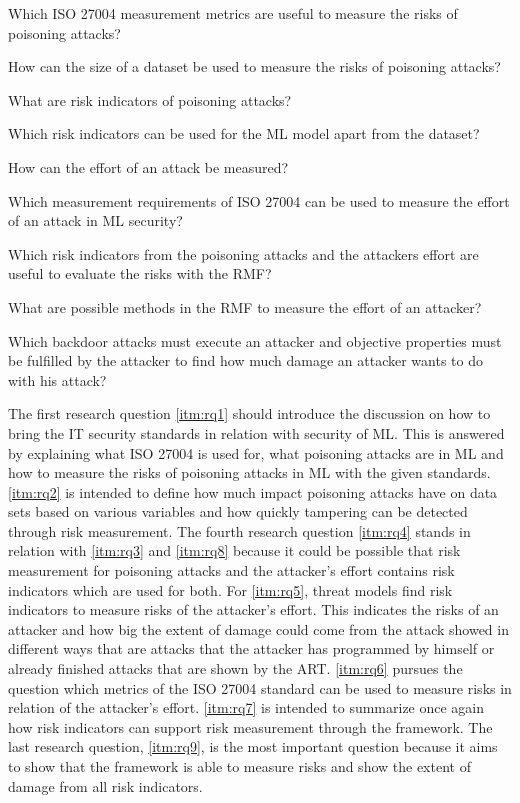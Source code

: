 \begin{questions}
  \item Which ISO 27004 measurement metrics are useful to measure the risks of poisoning attacks? \label{itm:rq1}
  \item How can the size of a dataset be used to measure the risks of poisoning attacks? \label{itm:rq2}
  \item What are risk indicators of poisoning attacks? \label{itm:rq3}
  \item Which risk indicators can be used for the ML model apart from the dataset? \label{itm:rq4}
  \item How can the effort of an attack be measured? \label{itm:rq5}
  \item Which measurement requirements of ISO 27004 can be used to measure the effort of an attack in ML security? \label{itm:rq6}
  \item Which risk indicators from the poisoning attacks and the attackers effort are useful to evaluate the risks with the RMF? \label{itm:rq7}
  \item What are possible methods in the RMF to measure the effort of an attacker? \label{itm:rq8}
  \item Which backdoor attacks must execute an attacker and objective properties must be fulfilled by the attacker to find how much damage an attacker wants to do with his attack?
  \label{itm:rq9}
\end{questions}

The first research question \ref{itm:rq1} should introduce the discussion on how to bring the IT security standards in relation with security of ML. This is answered by explaining what ISO
27004 is used for, what poisoning attacks are in ML and how to measure the risks of poisoning attacks in ML with the given standards. \ref{itm:rq2} is intended to define how much
impact poisoning attacks have on data sets based on various variables and how quickly tampering can be detected through risk measurement. The fourth research question \ref{itm:rq4} stands in relation with \ref{itm:rq3} and \ref{itm:rq8} because it could be possible that risk measurement for poisoning attacks and the attacker's effort contains risk indicators which are used for both. For \ref{itm:rq5}, threat models find risk indicators to measure risks of the attacker's effort. This indicates the risks of an attacker and how big the extent of damage could come from the attack showed in different ways that are attacks that the attacker has programmed by himself or already finished attacks that are shown by the ART. \ref{itm:rq6} pursues the question which metrics of the ISO 27004 standard can be used to measure risks in relation of the attacker's effort. \ref{itm:rq7} is intended to summarize once again how risk indicators can support risk measurement through the framework. The last research question, \ref{itm:rq9}, is the most important question because it aims to show that the framework is able to measure risks and show the extent of damage from all risk indicators.
